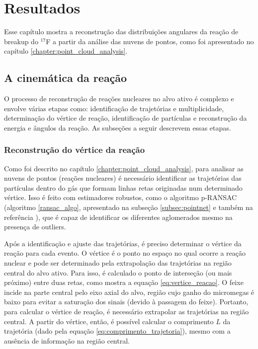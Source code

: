 \documentclass[a4paper,12pt,oneside]{book}
\begin{document}
\chapter{Resultados}\label{chapter:resultados}

\par Esse capítulo mostra a reconstrução das distribuições angulares da reação de breakup do $^{17}$F a partir da análise das nuvens de pontos, como foi apresentado no capítulo \ref{chapter:point_cloud_analysis}.

\section{A cinemática da reação}\label{sec:identif_reac_nucl}

\par O processo de reconstrução de reações nucleares no alvo ativo é complexo e envolve várias etapas como: identificação de trajetórias e multiplicidade, determinação do vértice de reação, identificação de partículas e reconstrução da energia e ângulos da reação. As subseções a seguir descrevem essas etapas.

\subsection{Reconstrução do vértice da reação}

\par Como foi descrito no capítulo \ref{chapter:point_cloud_analysis}, para analisar as nuvens de pontos (reações nucleares) é necessário identificar as trajetórias das partículas dentro do gás que formam linhas retas originadas num determinado vértice. Isso é feito com estimadores robustos, como o algoritmo p-RANSAC (algoritmo \ref{ransac_algo}, apresentado na subseção \ref{subsec:pointnet} e também na referência \cite{artigo}), que é capaz de identificar os diferentes aglomerados mesmo na presença de outliers.

\par Após a identificação e ajuste das trajetórias, é preciso determinar o vértice da reação para cada evento. O vértice é o ponto no espaço no qual ocorre a reação nuclear e pode ser determinado pela extrapolação das trajetórias na região central do alvo ativo. Para isso, é calculado o ponto de interseção (ou mais próximo) entre duas retas, como mostra a equação \ref{eq:vertice_reacao}. O feixe incide na parte central pelo eixo axial do alvo, região cujo ganho do micromegas é baixo para evitar a saturação dos sinais (devido à passagem do feixe). Portanto, para calcular o vértice de reação, é necessário extrapolar as trajetórias na região central. A partir do vértice, então, é possível calcular o comprimento $L$ da trajetória (dado pela equação \ref{eq:comprimento_trajetoria}), mesmo com a ausência de informação na região central.
\end{document}
